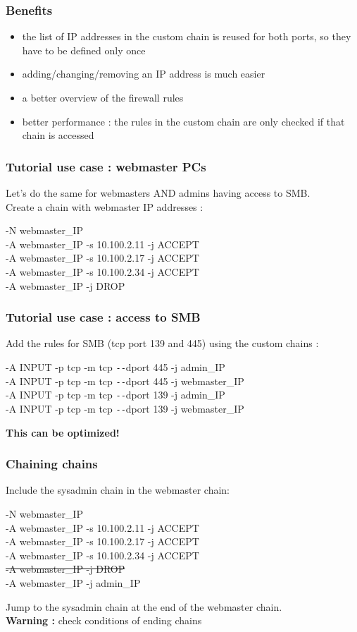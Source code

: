 \documentclass[14pt]{beamer}
\newcommand{\dd}{{\texttt{-{}-}}}
\begin{document}
  \begin{frame}
    \frametitle{Benefits}
    \begin{itemize}
      \item the list of IP addresses in the custom chain is reused for both ports, so they have to be defined only once
      \item adding/changing/removing an IP address is much easier
      \item a better overview of the firewall rules
      \item better performance : the rules in the custom chain are only checked if that chain is accessed
    \end{itemize}
  \end{frame}
  \begin{frame}
    \frametitle{Tutorial use case : webmaster PCs}
    Let's do the same for webmasters AND admins having access to SMB.\\
    \pause
    Create a chain with webmaster IP addresses :
    \begin{example}
      \small{-N webmaster\_IP\\
      -A webmaster\_IP -s 10.100.2.11 -j ACCEPT\\
      -A webmaster\_IP -s 10.100.2.17 -j ACCEPT\\
      -A webmaster\_IP -s 10.100.2.34 -j ACCEPT\\
      -A webmaster\_IP -j DROP}
    \end{example}
  \end{frame}
  \begin{frame}
    \frametitle{Tutorial use case : access to SMB}
    Add the rules for SMB (tcp port 139 and 445) using the custom chains :
    \begin{example}
      \small{-A INPUT -p tcp -m tcp \dd dport 445 -j admin\_IP\\
      -A INPUT -p tcp -m tcp \dd dport 445 -j webmaster\_IP\\
      -A INPUT -p tcp -m tcp \dd dport 139 -j admin\_IP\\
      -A INPUT -p tcp -m tcp \dd dport 139 -j webmaster\_IP}
    \end{example}
  \pause
  \textbf{This can be optimized!}
  \end{frame}
  \begin{frame}
    \frametitle{Chaining chains}
    Include the sysadmin chain in the webmaster chain:
    \begin{example}
      \small{-N webmaster\_IP\\
      -A webmaster\_IP -s 10.100.2.11 -j ACCEPT\\
      -A webmaster\_IP -s 10.100.2.17 -j ACCEPT\\
      -A webmaster\_IP -s 10.100.2.34 -j ACCEPT\\
      \sout{{\color{red}-A webmaster\_IP -j DROP}}\\
      {\color{blue}-A webmaster\_IP -j admin\_IP}}
    \end{example}
    Jump to the sysadmin chain at the end of the webmaster chain.\\
    \textbf{Warning :} check conditions of ending chains
  \end{frame}
\end{document}
